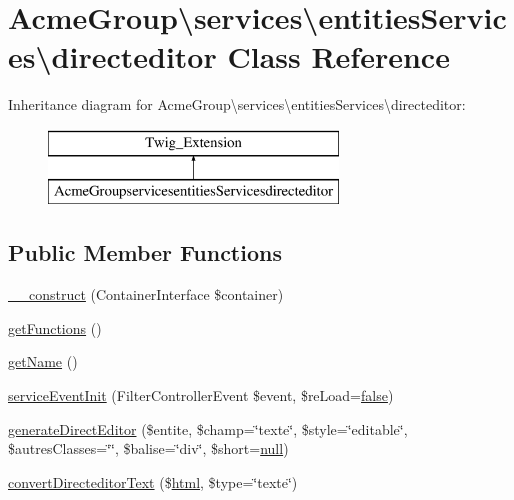 \hypertarget{class_acme_group_1_1services_1_1entities_services_1_1directeditor}{\section{Acme\+Group\textbackslash{}services\textbackslash{}entities\+Services\textbackslash{}directeditor Class Reference}
\label{class_acme_group_1_1services_1_1entities_services_1_1directeditor}
}
Inheritance diagram for Acme\+Group\textbackslash{}services\textbackslash{}entities\+Services\textbackslash{}directeditor\+:\begin{figure}[H]
\begin{center}
\leavevmode
\includegraphics[height=2.000000cm]{class_acme_group_1_1services_1_1entities_services_1_1directeditor}
\end{center}
\end{figure}
\subsection*{Public Member Functions}
\begin{DoxyCompactItemize}
\item 
\hyperlink{class_acme_group_1_1services_1_1entities_services_1_1directeditor_a1e21b2c17410a1e109adac0bb64d0d6a}{\+\_\+\+\_\+construct} (Container\+Interface \$container)
\item 
\hyperlink{class_acme_group_1_1services_1_1entities_services_1_1directeditor_a3fe7510ff104718f1a6a801bee852ba0}{get\+Functions} ()
\item 
\hyperlink{class_acme_group_1_1services_1_1entities_services_1_1directeditor_a6168824286859d50e0624eefe5f90279}{get\+Name} ()
\item 
\hyperlink{class_acme_group_1_1services_1_1entities_services_1_1directeditor_ac9e4e2b78dcf31eb792633c00144ea2c}{service\+Event\+Init} (Filter\+Controller\+Event \$event, \$re\+Load=\hyperlink{validate_8js_a5df37b7f02e5cdc7d9412b7f872b8e01}{false})
\item 
\hyperlink{class_acme_group_1_1services_1_1entities_services_1_1directeditor_aa79079fe18b0ef3bdb9613b50754ce25}{generate\+Direct\+Editor} (\$entite, \$champ=\char`\"{}texte\char`\"{}, \$style=\char`\"{}editable\char`\"{}, \$autres\+Classes=\char`\"{}\char`\"{}, \$balise=\char`\"{}div\char`\"{}, \$short=\hyperlink{validate_8js_afb8e110345c45e74478894341ab6b28e}{null})
\item 
\hyperlink{class_acme_group_1_1services_1_1entities_services_1_1directeditor_ab049488c25b63ba5b9cc0fe0bc0e16ae}{convert\+Directeditor\+Text} (\$\hyperlink{tinymce_8jquery_8dev_8js_ac2090bcf2ff968c0083d5de53a6544f3}{html}, \$type=\char`\"{}texte\char`\"{})
\end{DoxyCompactItemize}
